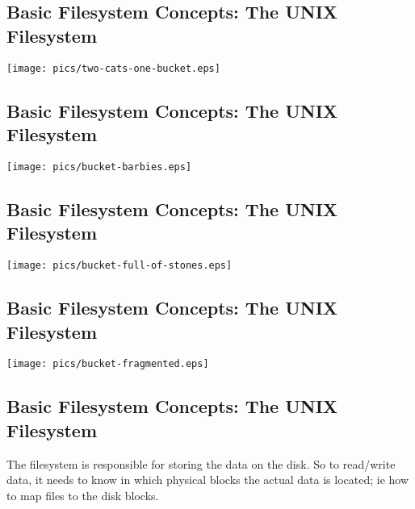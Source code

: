 \documentclass[xga]{xdvislides}
\begin{document}
\subsection{Basic Filesystem Concepts: The UNIX Filesystem}
\vspace*{\fill}
\begin{center}
\texttt{[image: pics/two-cats-one-bucket.eps]} \\
\end{center}
\vspace*{\fill}

\subsection{Basic Filesystem Concepts: The UNIX Filesystem}
\begin{center}
\texttt{[image: pics/bucket-barbies.eps]} \\
\end{center}

\subsection{Basic Filesystem Concepts: The UNIX Filesystem}
\vspace*{\fill}
\begin{center}
\texttt{[image: pics/bucket-full-of-stones.eps]} \\
\end{center}
\vspace*{\fill}

\subsection{Basic Filesystem Concepts: The UNIX Filesystem}
\vspace*{\fill}
\begin{center}
\texttt{[image: pics/bucket-fragmented.eps]} \\
\end{center}
\vspace*{\fill}

\subsection{Basic Filesystem Concepts: The UNIX Filesystem}
The filesystem is responsible for storing the data on the disk.
So to read/write data, it needs to know in which physical blocks the actual
data is located; ie how to map files to the disk blocks.
\\
\end{document}
